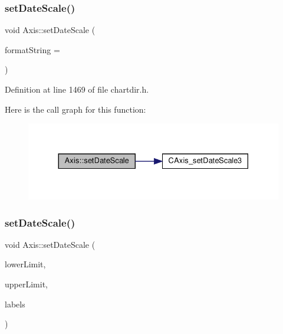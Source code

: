 \subsubsection{\texorpdfstring{set\+Date\+Scale()}{setDateScale()}\hspace{0.1cm}{\footnotesize\ttfamily [1/3]}}
{\footnotesize\ttfamily void Axis\+::set\+Date\+Scale (\begin{DoxyParamCaption}\item[{const char $\ast$}]{format\+String = {} }\end{DoxyParamCaption})\hspace{0.3cm}{\ttfamily [inline]}}



Definition at line 1469 of file chartdir.\+h.

Here is the call graph for this function\+:
\nopagebreak
\begin{figure}[H]
\begin{center}
\leavevmode
\includegraphics[width=330pt]{class_axis_aac131ccbb91b9c5587334e2703923b70_cgraph}
\end{center}
\end{figure}
\mbox{\label{class_axis_a8b68b9e92ed809ecadf3aa3e46c77983}} 
\subsubsection{\texorpdfstring{set\+Date\+Scale()}{setDateScale()}\hspace{0.1cm}{\footnotesize\ttfamily [2/3]}}
{\footnotesize\ttfamily void Axis\+::set\+Date\+Scale (\begin{DoxyParamCaption}\item[{double}]{lower\+Limit,  }\item[{double}]{upper\+Limit,  }\item[{\hyperlink{class_string_array}{String\+Array}}]{labels }\end{DoxyParamCaption})\hspace{0.3cm}{\ttfamily [inline]}}



